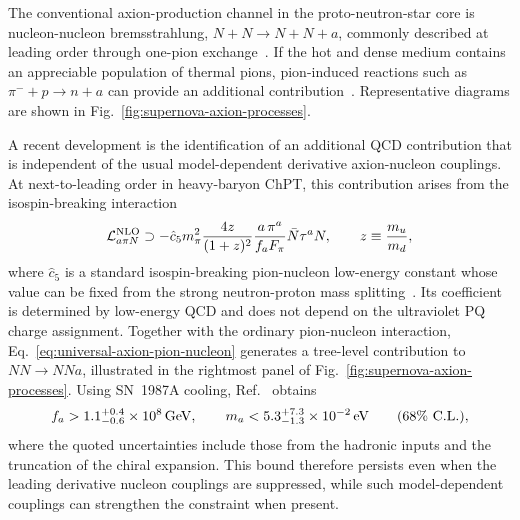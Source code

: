 \documentclass[review]{elsarticle}
\numberwithin{equation}{section}
\numberwithin{table}{section}
\numberwithin{figure}{section}
\begin{document}
The conventional axion-production channel in the proto-neutron-star core is nucleon-nucleon bremsstrahlung, $N+N\rightarrow N+N+a$, commonly described at leading order through one-pion exchange~\cite{Carenza:2019pxu}. If the hot and dense medium contains an appreciable population of thermal pions, pion-induced reactions such as $\pi^-+p\rightarrow n+a$ can provide an additional contribution~\cite{Carenza:2020cis}. Representative diagrams are shown in Fig.~\ref{fig:supernova-axion-processes}.

A recent development is the identification of an additional QCD contribution that is independent of the usual model-dependent derivative axion-nucleon couplings. At next-to-leading order in heavy-baryon ChPT, this contribution arises from the isospin-breaking interaction~\cite{Springmann:2024ret}
\begin{align}
    \mathcal{L}^{\rm NLO}_{a\pi N}
    \supset
    -\hat c_5 m_\pi^2
    \frac{4z}{(1+z)^2}
    \frac{a\,\pi^a}{f_aF_\pi}
    \bar N\tau^a N,
    \qquad
    z\equiv\frac{m_u}{m_d},
    \label{eq:universal-axion-pion-nucleon}
\end{align}
where $\hat c_5$ is a standard isospin-breaking pion-nucleon low-energy constant whose value can be fixed from the strong neutron-proton mass splitting~\cite{Bernard:1996gq}. Its coefficient is determined by low-energy QCD and does not depend on the ultraviolet PQ charge assignment. Together with the ordinary pion-nucleon interaction, Eq.~\eqref{eq:universal-axion-pion-nucleon} generates a tree-level contribution to $NN\rightarrow NNa$, illustrated in the rightmost panel of Fig.~\ref{fig:supernova-axion-processes}. Using SN~1987A cooling, Ref.~\cite{Springmann:2024ret} obtains
\begin{align}
    f_a
    >
    1.1^{+0.4}_{-0.6}\times10^8\,{\rm GeV},
    \qquad
    m_a
    <
    5.3^{+7.3}_{-1.3}\times10^{-2}\,{\rm eV}
    \qquad
    (68\%~{\rm C.L.}),
    \label{eq:universal-SN-axion-bound}
\end{align}
where the quoted uncertainties include those from the hadronic inputs and the truncation of the chiral expansion. This bound therefore persists even when the leading derivative nucleon couplings are suppressed, while such model-dependent couplings can strengthen the constraint when present.
\end{document}

